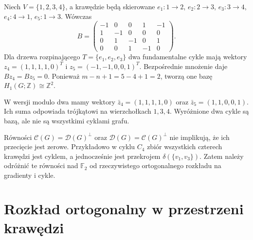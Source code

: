 \begin{przyklad}
Niech $V=\{1,2,3,4\}$, a krawędzie będą skierowane
$e_1:1\to2$, $e_2:2\to3$, $e_3:3\to4$,
$e_4:4\to1$, $e_5:1\to3$. Wówczas
\[
B=\begin{pmatrix}
-1&0&0&1&-1\\1&-1&0&0&0\\
0&1&-1&0&1\\0&0&1&-1&0
\end{pmatrix}.
\]
Dla drzewa rozpinającego $T=\{e_1,e_2,e_3\}$
dwa fundamentalne cykle mają wektory
$z_4=(1,1,1,1,0)^T$ i $z_5=(-1,-1,0,0,1)^T$.
Bezpośrednie mnożenie daje $Bz_4=Bz_5=0$.
Ponieważ $m-n+1=5-4+1=2$, tworzą one bazę
$H_1(G;\mathbb Z)\cong\mathbb Z^2$.

W wersji modulo dwa mamy wektory
$\bar z_4=(1,1,1,1,0)$ oraz $\bar z_5=(1,1,0,0,1)$.
Ich suma odpowiada trójkątowi na wierzchołkach $1,3,4$.
Wyróżnione dwa cykle są bazą, ale nie są wszystkimi
cyklami grafu.
\end{przyklad}

\begin{center}
\end{center}

\begin{uwaga}
Równości $\mathcal C(G)=\mathcal D(G)^\perp$ oraz
$\mathcal D(G)=\mathcal C(G)^\perp$ nie implikują,
że ich przecięcie jest zerowe. Przykładowo w cyklu
$C_4$ zbiór wszystkich czterech krawędzi jest cyklem,
a jednocześnie jest przekrojem $\delta(\{v_1,v_3\})$.
Zatem należy odróżnić te równości nad $\mathbb F_2$
od rzeczywistego ortogonalnego rozkładu na gradienty i cykle.
\end{uwaga}

\section{Rozkład ortogonalny w przestrzeni krawędzi}
\label{sec:tg-linear-hodge}

